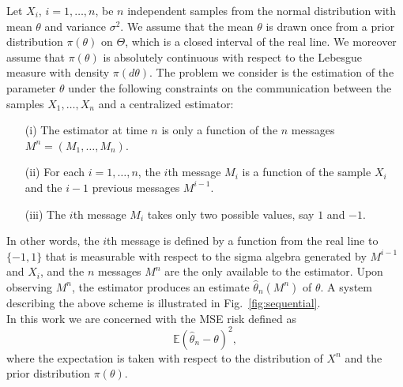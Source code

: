 \documentclass[letterpaper, conference]{IEEEtran}      %
\begin{document}
Let $X_i$, $i=1,\ldots,n$, be $n$ independent samples from the normal distribution with mean $\theta$ and variance $\sigma^2$. We assume that the mean $\theta$ is drawn once from a prior distribution $\pi(\theta)$ on $\Theta$, which is a closed interval of the real line. We moreover assume that $\pi(\theta)$ is absolutely continuous with respect to the Lebesgue measure with density $\pi(d\theta)$. The problem we consider is the estimation of the parameter $\theta$ under the following constraints on the communication between the samples $X_1,\ldots,X_n$ and a centralized estimator: 
\begin{itemize}
\item[(i)] The estimator at time $n$ is only a function of the $n$ messages $M^n = \left(M_1,\ldots,M_n \right)$.
\item[(ii)] For each $i=1,\ldots,n$, the $i$th message $M_i$ is a function of the sample $X_i$ and the $i-1$ previous messages $M^{i-1}$.
\item[(iii)] The $i$th message $M_i$ takes only two possible values, say $1$ and $-1$. 
\end{itemize}
In other words, the $i$th message is defined by a function from the real line to $\{-1,1\}$ that is measurable with respect to the sigma algebra generated by $M^{i-1}$ and $X_i$, and the $n$ messages $M^n$ are the only available to the estimator. Upon observing $M^n$, the estimator produces an estimate $\widehat{\theta}_n(M^n)$ of $\theta$. A system describing the above scheme is illustrated in Fig.~\ref{fig:sequential}. \\

In this work we are concerned with the MSE risk defined as
\begin{equation}
\label{eq:error_def}
\mathbb E\left(\widehat{\theta}_n - \theta \right)^2,
\end{equation}
where the expectation is taken with respect to the distribution of $X^n$ and the prior distribution $\pi(\theta)$. \\
\end{document}
